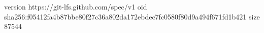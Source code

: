 version https://git-lfs.github.com/spec/v1
oid sha256:f05412fa4b87bbe80f27c36a802da172ebdec7fc0580f80d9a494f671fd1b421
size 87544
